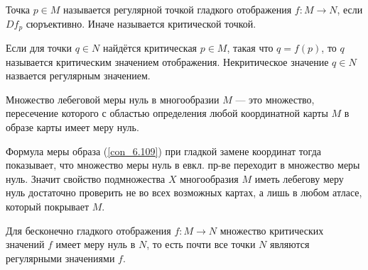 \begin{to_def}
	Точка $p \in M$ называется регулярной точкой гладкого отображения $f \colon M \rightarrow N$, если $D f_{p}$ сюръективно. Иначе называется критической точкой.

	Если для точки $q \in N$ найдётся критическая $p \in M$, такая что $q = f(p)$, то $q$ называется критическим значением отображения. Некритическое значение $q \in N$ назвается регулярным значением.
\end{to_def}

\begin{to_def}
	Множество лебеговой меры нуль в многообразии $M$ --- это множество, пересечение которого с областью определения любой координатной карты $M$ в образе карты имеет меру нуль.
\end{to_def}

Формула меры образа (\ref{con_6.109}) при гладкой замене координат тогда показывает, что множество меры нуль в евкл. пр-ве переходит в множество меры нуль. Значит свойство подмножества $X$ многообразия $M$ иметь лебегову меру нуль достаточно проверить не во всех возможных картах, а лишь в любом атласе, который покрывает $M$.

\begin{to_thr}
	Для бесконечно гладкого отображения $f \colon M \rightarrow N$ множество критических значений $f$ имеет меру нуль в $N$, то есть почти все точки $N$ являются регулярными значениями $f$.
\end{to_thr}